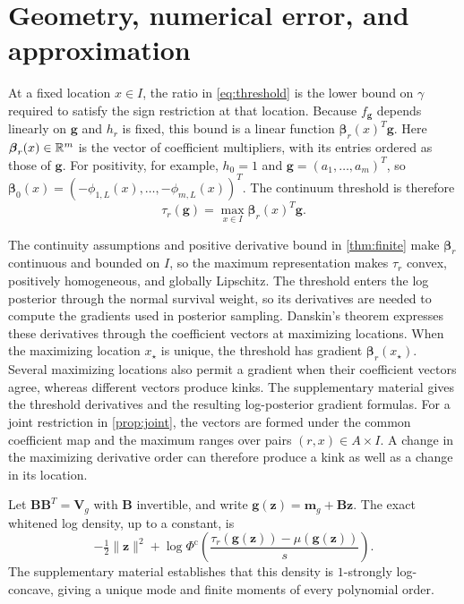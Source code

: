 \section{Geometry, numerical error, and approximation}\label{sec:theory}

At a fixed location $x\in I$, the ratio in \cref{eq:threshold} is
the lower bound on $\gamma$ required to satisfy the sign restriction
at that location. Because $f_{\boldsymbol g}$ depends linearly on
$\boldsymbol g$ and $h_r$ is fixed, this bound is a linear function
$\boldsymbol\beta_r(x)^T\boldsymbol g$. Here
$\boldsymbol\beta_r(x)\in\mathbb R^m$ is the vector of coefficient
multipliers, with its entries ordered as those of $\boldsymbol g$.
For positivity, for example, $h_0=1$ and
$\boldsymbol g=(a_1,\ldots,a_m)^T$, so
$\boldsymbol\beta_0(x)=(-\phi_{1,L}(x),\ldots,-\phi_{m,L}(x))^T$.
The continuum threshold is therefore
\[
 \tau_r(\boldsymbol g)
   =\max_{x\in I}\boldsymbol\beta_r(x)^T\boldsymbol g.
\]

The continuity assumptions and positive derivative bound in
\cref{thm:finite} make $\boldsymbol\beta_r$ continuous and bounded
on $I$, so the maximum representation makes $\tau_r$ convex,
positively homogeneous, and globally Lipschitz.
The threshold enters the log posterior through the normal survival
weight, so its derivatives are needed to compute the gradients used
in posterior sampling. Danskin's theorem \citep{danskin1966maxmin}
expresses these derivatives through the coefficient vectors at
maximizing locations. When the maximizing location $x_\star$ is
unique, the threshold has gradient $\boldsymbol\beta_r(x_\star)$.
Several maximizing locations also permit a gradient when their
coefficient vectors agree, whereas different vectors produce kinks.
The supplementary material gives the threshold derivatives and the
resulting log-posterior gradient formulas.
For a joint restriction in \cref{prop:joint},
the vectors are formed under the common coefficient map and the
maximum ranges over pairs $(r,x)\in A\times I$. A change in the
maximizing derivative order can therefore produce a kink as well
as a change in its location.

Let $\boldsymbol B\boldsymbol B^T=\boldsymbol V_g$ with
$\boldsymbol B$ invertible, and write
$\boldsymbol g(\boldsymbol z)=\boldsymbol m_g+\boldsymbol B\boldsymbol z$.
The exact whitened log density, up to a constant, is
\begin{equation}\label{eq:whitened-target}
 -\tfrac12\|\boldsymbol z\|^2+
 \log\Phi^{\mathrm c}\left(\frac{\tau_r(\boldsymbol g(\boldsymbol z))
                         -\mu(\boldsymbol g(\boldsymbol z))}{s}\right).
\end{equation}
The supplementary material establishes that this density is
$1$-strongly log-concave, giving a unique mode and finite moments of
every polynomial order.

